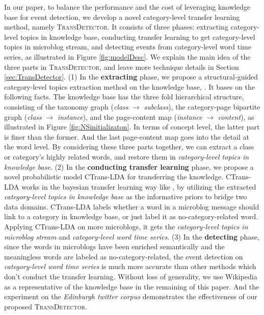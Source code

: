 \documentclass[runningheads,a4paper]{llncs}
\theoremstyle{exampstyle}
\begin{document}
In our paper, to balance the performance and the cost of leveraging knowledge base for event detection, we develop a novel category-level transfer learning method, namely \textsc{TransDetector}.
It consists of three phases: extracting category-level topics in knowledge base, conducting transfer learning to get category-level topics in microblog stream, and detecting events from category-level word time series, as illustrated in Figure \ref{fig:modelDesc}.
We explain the main idea of the three parts in \textsc{TransDetector}, and leave more technique details in Section \ref{sec:TransDetector}.
(1) In the \textbf{extracting} phase, we propose a structural-guided category-level topics extraction method on the knowledge base, . 
It bases on the following facts. 
The knowledge base has the three fold hierarchical structure, consisting of the taxonomy graph (\textit{class} \(\rightarrow\) \textit{subclass}), the category-page bipartite graph (\textit{class} \(\rightarrow\) \textit{instance}), and the page-content map (\textit{instance} \(\rightarrow\) \textit{content}), as illustrated in Figure \ref{fig:NSinitializaton}.
In terms of concept level, the latter part is finer than the former. 
And the last page-content map goes into the detail at the word level. 
By considering these three parts together, we can extract a class or category's highly related words, and restore them in \textit{category-level topics in knowledge base}.
(2) In the \textbf{conducting transfer learning} phase, we propose a novel probabilistic model CTrans-LDA for transferring the knowledge.
CTrans-LDA works in the bayesian transfer learning way like \cite{dai2007transferring}, by utilizing the extracted \textit{category-level topics in knowledge base} as the informative priors to bridge two data domains. 
CTrans-LDA labels whether a word in a microblog message should link to a category in knowledge base, or just label it as no-category-related word.
Applying CTrans-LDA on more microblogs, it gets the \textit{category-level topics in microblog stream} and \textit{category-level word time series}.
(3) In the \textbf{detecting} phase, since the words in microblogs have been enriched semantically and the meaningless words are labeled as no-category-related, the event detection on \textit{category-level word time series} is much more accurate than other methods which don't conduct the transfer learning.
Without loss of generality, we use Wikipedia as a representative of the knowledge base in the remaining of this paper.
And the experiment on the \textit{Edinburgh twitter corpus} demonstrates the effectiveness of our proposed \textsc{TransDetector}.
\end{document}
